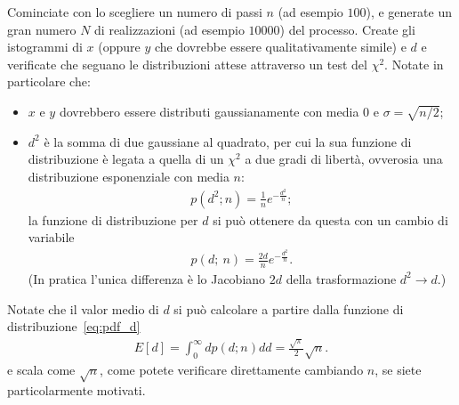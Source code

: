 \documentclass{lab1-article}
\begin{document}
\begin{article}
Cominciate con lo scegliere un numero di passi $n$ (ad esempio $100$), e generate un
gran numero $N$ di realizzazioni (ad esempio $10000$) del processo. Create gli istogrammi
di $x$ (oppure $y$ che dovrebbe essere qualitativamente simile) e $d$ e verificate
che seguano le distribuzioni attese attraverso un test del $\chi^2$. Notate in particolare
che:
\begin{itemize}
    \item $x$ e $y$ dovrebbero essere distributi gaussianamente con media $0$ e
        $\sigma = \sqrt{n / 2}$;
    \item $d^2$ \`e la somma di due gaussiane al quadrato, per cui la sua funzione
    di distribuzione \`e legata a quella di un $\chi^2$ a due gradi di libert\`a,
    ovverosia una distribuzione esponenziale con media $n$:
    \begin{align*}
        p(d^2; n) = \frac{1}{n} e^{-\frac{d^2}{n}};
    \end{align*}
    la funzione di distribuzione per $d$ si pu\`o ottenere da questa con un cambio
    di variabile
    \begin{align}\label{eq:pdf_d}
        p(d;~n) = \frac{2d}{n} e^{-\frac{d^2}{n}}.
    \end{align}
    (In pratica l'unica differenza \`e lo Jacobiano $2d$ della trasformazione
    $d^2 \rightarrow d$.)
\end{itemize}

Notate che il valor medio di $d$ si pu\`o calcolare a partire dalla funzione di
distribuzione~\eqref{eq:pdf_d}
\begin{align}
    E[d] = \int_0^\infty d p(d; n) dd = \frac{\sqrt{\pi}}{2} \sqrt{n}.
\end{align}
e scala come $\sqrt{n}$, come potete verificare direttamente cambiando $n$, se
siete particolarmente motivati.






\end{article}
\end{document}
